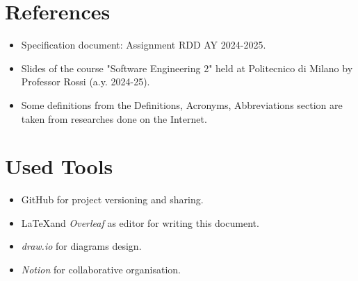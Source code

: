 \section{References}
\begin{itemize}
    \item Specification document: Assignment RDD AY 2024-2025. 
    \item Slides of the course "Software Engineering 2" held at Politecnico di Milano by Professor Rossi (a.y. 2024-25).
    \item Some definitions from the Definitions, Acronyms, Abbreviations section are taken from researches done on the Internet.
\end{itemize}
\section{Used Tools}
\begin{itemize}
    \item GitHub for project versioning and sharing.
    \item \LaTeX\space and \textit{Overleaf} as editor for writing this document.
    \item \textit{draw.io} for diagrams design.
    \item \textit{Notion} for collaborative organisation.
\end{itemize}